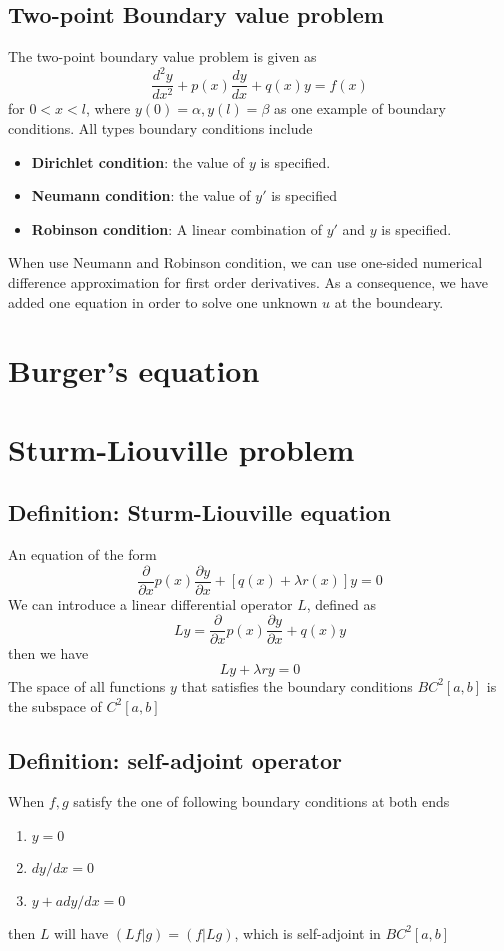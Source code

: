 \begin{refsection}
\subsection{Two-point Boundary value problem}
\begin{definition}
	The two-point boundary value problem is given as
	$$\frac{d^2y}{dx^2} + p(x)\frac{dy}{dx} + q(x)y = f(x)$$
	for $0<x<l$, where $y(0)=\alpha, y(l) = \beta$ as one example of boundary conditions. All types boundary conditions include
	\begin{itemize}
		\item \textbf{Dirichlet condition}: the value of $y$ is specified.
		\item \textbf{Neumann condition}: the value of $y'$ is specified
		\item \textbf{Robinson condition}: A linear combination of $y'$ and $y$ is specified.
	\end{itemize}
\end{definition}



\begin{remark}
	When use Neumann and Robinson condition, we can use one-sided numerical difference approximation for first order derivatives. As a consequence, we have added one equation in order to solve one unknown $u$ at the boundeary.  
\end{remark}


\iffalse
\section{Burger's equation}

\section{Sturm-Liouville problem}
\subsection{Definition: Sturm-Liouville equation}
An equation of the form
$$\frac{\partial}{\partial x} p(x)\frac{\partial y}{\partial x} + [q(x) + \lambda r(x)]y = 0$$ 
We can introduce a linear differential operator $L$, defined as
$$Ly = \frac{\partial}{\partial x} p(x)\frac{\partial y}{\partial x} + q(x)y$$
then we have $$Ly + \lambda ry = 0$$
The space of all functions $y$ that satisfies the boundary conditions $BC^2[a,b]$ is the subspace of $C^2[a,b]$

\subsection{Definition: self-adjoint operator}
When $f,g$ satisfy the one of following boundary conditions at both ends
\begin{enumerate}
\item $y=0$
\item $dy/dx = 0$
\item $y+ady/dx = 0$
\end{enumerate}
then $L$ will have $(Lf|g)=(f|Lg)$, which is self-adjoint in $BC^2[a,b]$



\end{refsection}
